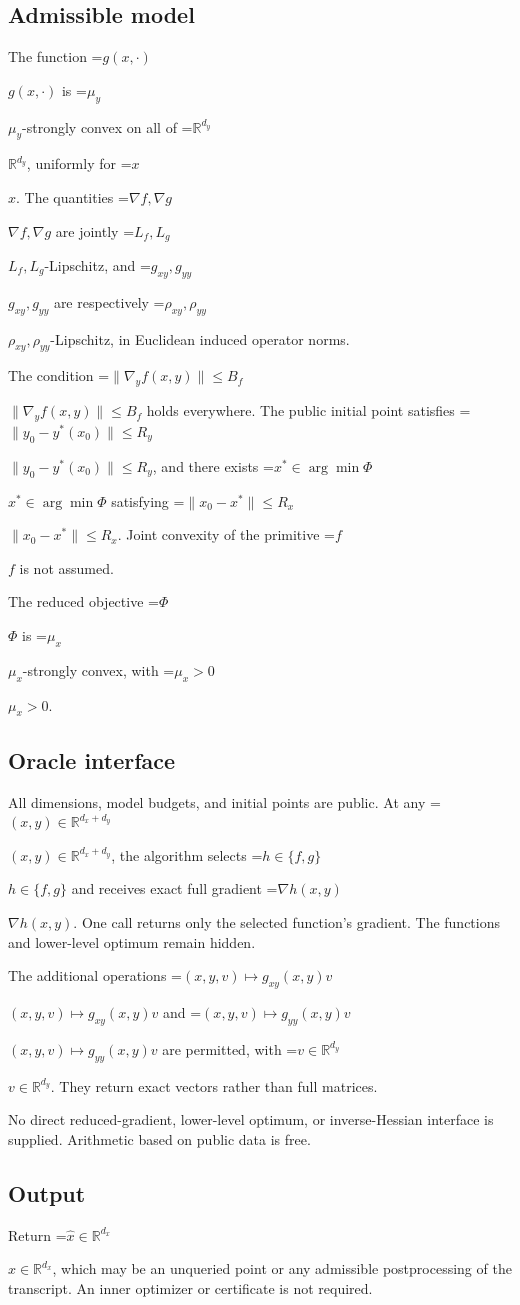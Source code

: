 \documentclass[10pt,a4paper]{article}
\newcommand{\AtlasMath}[1]{\par\begingroup\centering\setbox0=\hbox{$\displaystyle #1$}\ifdim\wd0>1.4\linewidth\typeout{ATLAS WIDE FORMULA: \the\wd0}\fi\ifdim\wd0>\linewidth\resizebox{\linewidth}{!}{\box0}\else\box0\fi\par\endgroup}
\newcommand{\AtlasInlineMath}[1]{\begingroup\setbox0=\hbox{$#1$}\ifdim\wd0>.4\linewidth\endgroup\AtlasMath{#1}\else\endgroup$#1$\fi}
\begin{document}
\subsection{Admissible model}
The function \AtlasInlineMath{g(x,\cdot)} is \AtlasInlineMath{\mu_y}-strongly convex on all of \AtlasInlineMath{\mathbb{R}^{d_y}}, uniformly for \AtlasInlineMath{x}. The quantities \AtlasInlineMath{\nabla f,\nabla g} are jointly \AtlasInlineMath{L_f,L_g}-Lipschitz, and \AtlasInlineMath{g_{xy},g_{yy}} are respectively \AtlasInlineMath{\rho_{xy},\rho_{yy}}-Lipschitz, in Euclidean induced operator norms.

The condition \AtlasInlineMath{\|\nabla_y f(x,y)\|\le B_f} holds everywhere. The public initial point satisfies \AtlasInlineMath{\|y_0-y^*(x_0)\|\le R_y}, and there exists \AtlasInlineMath{x^*\in\arg\min\Phi} satisfying \AtlasInlineMath{\|x_0-x^*\|\le R_x}. Joint convexity of the primitive \AtlasInlineMath{f} is not assumed.

The reduced objective \AtlasInlineMath{\Phi} is \AtlasInlineMath{\mu_x}-strongly convex, with \AtlasInlineMath{\mu_x>0}.

\subsection{Oracle interface}
All dimensions, model budgets, and initial points are public. At any \AtlasInlineMath{(x,y)\in\mathbb{R}^{d_x+d_y}}, the algorithm selects \AtlasInlineMath{h\in\{f,g\}} and receives exact full gradient \AtlasInlineMath{\nabla h(x,y)}. One call returns only the selected function's gradient. The functions and lower-level optimum remain hidden.

The additional operations \AtlasInlineMath{(x,y,v)\mapsto g_{xy}(x,y)v} and \AtlasInlineMath{(x,y,v)\mapsto g_{yy}(x,y)v} are permitted, with \AtlasInlineMath{v\in\mathbb{R}^{d_y}}. They return exact vectors rather than full matrices.

No direct reduced-gradient, lower-level optimum, or inverse-Hessian interface is supplied. Arithmetic based on public data is free.

\subsection{Output}
Return \AtlasInlineMath{\widehat{x}\in\mathbb{R}^{d_x}}, which may be an unqueried point or any admissible postprocessing of the transcript. An inner optimizer or certificate is not required.
\end{document}
